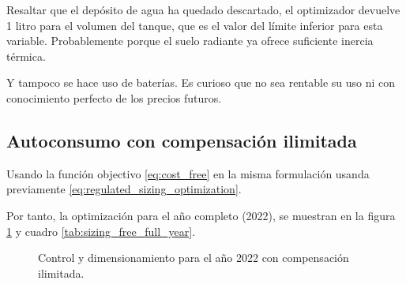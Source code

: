 Resaltar que el depósito de agua ha quedado descartado, el optimizador devuelve
1 litro para el volumen del tanque, que es el valor del límite inferior para
esta variable. Probablemente porque el suelo radiante ya ofrece suficiente
inercia térmica.

Y tampoco se hace uso de baterías. Es curioso que no sea rentable su uso ni con
conocimiento perfecto de los precios futuros.

\clearpage
\subsection{Autoconsumo con compensación ilimitada}

Usando la función objectivo \eqref{eq:cost_free} en la misma formulación usanda
previamente \eqref{eq:regulated_sizing_optimization}.

Por tanto, la optimización para el año completo (2022), se muestran en la
figura \ref{fig:sizing_free_full_year} y cuadro \ref{tab:sizing_free_full_year}.

\begin{figure}[h] \centering
	\centering
	
	\caption{Control y dimensionamiento para el año 2022 con compensación ilimitada.}
	\label{fig:sizing_free_full_year}
\end{figure}

